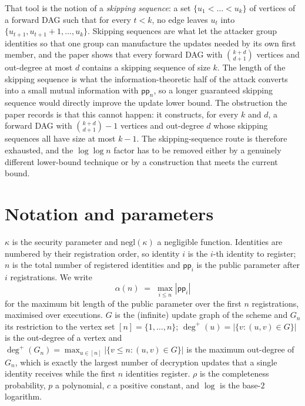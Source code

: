 \documentclass{conjura-conjecture}
\newcommand{\pp}{\mathsf{pp}}
\newcommand{\negl}{\mathrm{negl}}
\newcommand{\outdeg}{\deg^{+}}
\begin{document}
That tool is the notion of a \emph{skipping sequence}: a set
$\{u_1 < \dots < u_k\}$ of vertices of a forward DAG such that for every
$t < k$, no edge leaves $u_t$ into
$\{u_{t+1}, u_{t+1}+1, \dots, u_k\}$. Skipping sequences are what let
the attacker group identities so that one group can manufacture the
updates needed by its own first member, and the paper shows that every
forward DAG with $\binom{k+d}{d+1}$ vertices and out-degree at most $d$
contains a skipping sequence of size $k$. The length of the skipping
sequence is what the information-theoretic half of the attack converts
into a small mutual information with $\pp_n$, so a longer guaranteed
skipping sequence would directly improve the update lower bound. The
obstruction the paper records is that this cannot happen: it constructs,
for every $k$ and $d$, a forward DAG with $\binom{k+d}{d+1}-1$ vertices
and out-degree $d$ whose skipping sequences all have size at most
$k-1$. The skipping-sequence route is therefore exhausted, and the
$\log\log n$ factor has to be removed either by a genuinely different
lower-bound technique or by a construction that meets the current
bound.

\section{Notation and parameters}\label{sec:notation}

\noindent
$\kappa$ is the security parameter and $\negl(\kappa)$ a negligible
function. Identities are numbered by their registration order, so
identity $i$ is the $i$-th identity to register; $n$ is the total number
of registered identities and $\pp_i$ is the public parameter after $i$
registrations. We write
\[
  \alpha(n) \;=\; \max_{i \le n} |\pp_i|
\]
for the maximum bit length of the public parameter over the first $n$
registrations, maximised over executions. $G$ is the (infinite) update
graph of the scheme and $G_n$ its restriction to the vertex set
$[n] = \{1,\dots,n\}$; $\outdeg(u) = |\{v : (u,v) \in G\}|$ is the
out-degree of a vertex and
$\outdeg(G_n) = \max_{u \in [n]} |\{v \le n : (u,v) \in G\}|$ is the
maximum out-degree of $G_n$, which is exactly the largest number of
decryption updates that a single identity receives while the first $n$
identities register. $\rho$ is the completeness probability, $p$ a
polynomial, $c$ a positive constant, and $\log$ is the base-$2$
logarithm.
\end{document}
